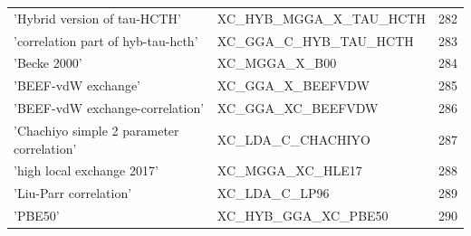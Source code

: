 \documentclass[final,12pt,makeidx,DIV=calc]{article}
\begin{document}
{{{{{{\begin{table}[!h]
\begin{center}
\begin{tabular}{llr}
  'Hybrid version of tau-HCTH' & XC\_HYB\_MGGA\_X\_TAU\_HCTH  &282\\
  'correlation part of hyb-tau-hcth' & XC\_GGA\_C\_HYB\_TAU\_HCTH  &283\\
  'Becke 2000' & XC\_MGGA\_X\_B00  &284\\
  'BEEF-vdW exchange' & XC\_GGA\_X\_BEEFVDW  &285\\
  'BEEF-vdW exchange-correlation' & XC\_GGA\_XC\_BEEFVDW  &286\\
  'Chachiyo simple 2 parameter correlation' & XC\_LDA\_C\_CHACHIYO  &287\\
  'high local exchange 2017' & XC\_MGGA\_XC\_HLE17  &288\\
  'Liu-Parr correlation' & XC\_LDA\_C\_LP96  &289\\
  'PBE50' & XC\_HYB\_GGA\_XC\_PBE50  &290\\
\hline
\hline
\end{tabular}
\end{center}
\end{table}

}}}}}}
\end{document}

